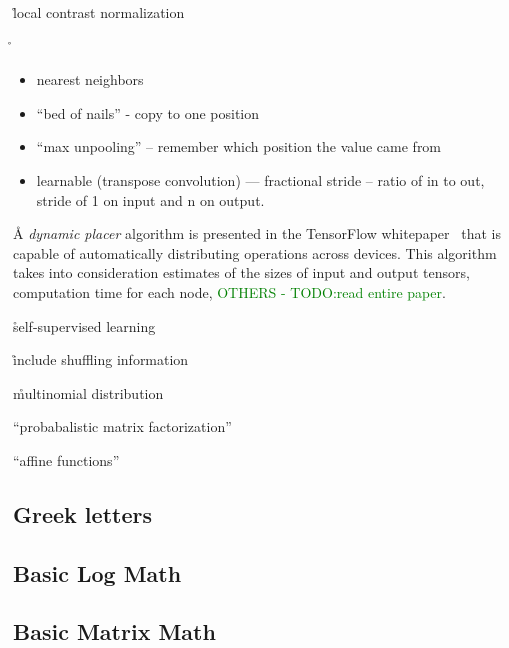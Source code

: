 \r{local contrast normalization}

\r{\begin{itemize}[noitemsep,topsep=0pt]
		\item nearest neighbors
		\item ``bed of nails'' - copy to one position
		\item ``max unpooling'' -- remember which position the value came from
		\item learnable (transpose convolution) --- fractional stride -- ratio of in to out, stride of 1 on input and n on output.
	\end{itemize}
}




\r{A \textit{dynamic placer} algorithm is presented in the {TensorFlow whitepaper}~\cite{abadi2016tensorflow_device_placement} that is capable of automatically distributing operations across devices. This algorithm takes into consideration  estimates of the sizes of input and output tensors, computation time for each node, \textcolor{green}{OTHERS - TODO:read entire paper}.}

\r{self-supervised learning}


\r{include shuffling information}

\r{multinomial distribution}

\r{``probabalistic matrix factorization''}

\r{``affine functions''}



\subsection{Greek letters}


\subsection{Basic Log Math}

\subsection{Basic Matrix Math}

